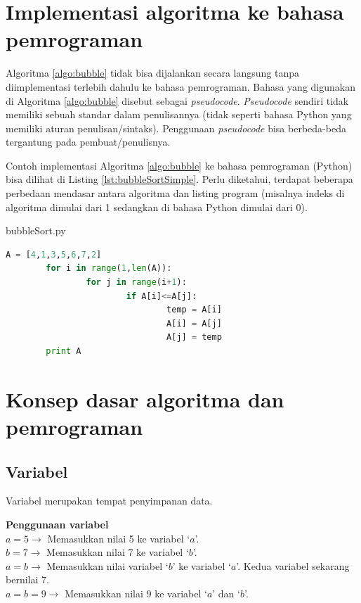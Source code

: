 \section{Implementasi algoritma ke bahasa pemrograman}
Algoritma \ref{algo:bubble} tidak bisa dijalankan secara langsung tanpa diimplementasi terlebih dahulu ke bahasa pemrograman. Bahasa yang digunakan di Algoritma \ref{algo:bubble} disebut sebagai \textit{pseudocode}. \textit{Pseudocode} sendiri tidak memiliki sebuah standar dalam penulisannya (tidak seperti bahasa Python yang memiliki aturan penulisan/sintaks). Penggunaan \textit{pseudocode} bisa berbeda-beda tergantung pada pembuat/penulisnya. 

Contoh implementasi Algoritma \ref{algo:bubble} ke bahasa pemrograman (Python) bisa dilihat di Listing \ref{lst:bubbleSortSimple}. Perlu diketahui, terdapat beberapa perbedaan mendasar antara algoritma dan listing program (misalnya indeks di algoritma dimulai dari 1 sedangkan di bahasa Python dimulai dari 0). 

\begin{listprog}{bubbleSort.py}
	\label{lst:bubbleSortSimple}
	\begin{lstlisting}[language=Python]
		A = [4,1,3,5,6,7,2]
		for i in range(1,len(A)):
				for j in range(i+1):
						if A[i]<=A[j]:
								temp = A[i]
								A[i] = A[j]
								A[j] = temp
		print A
	\end{lstlisting}
\end{listprog}

\section{Konsep dasar algoritma dan pemrograman}

\subsection{Variabel}

Variabel merupakan tempat penyimpanan data. 
\begin{contoh}
	\textbf{Penggunaan variabel}\\
	$a = 5 \rightarrow$ Memasukkan nilai 5 ke variabel `$a$'.\\
	$b = 7 \rightarrow$ Memasukkan nilai 7 ke variabel `$b$'.\\
	$a = b \rightarrow$ Memasukkan nilai variabel `$b$' ke variabel `$a$'. Kedua variabel sekarang bernilai 7.\\
	$a = b = 9 \rightarrow$ Memasukkan nilai 9 ke variabel `$a$' dan `$b$'.\\
\end{contoh}



